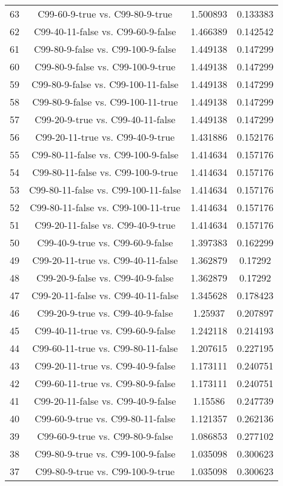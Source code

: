 \documentclass[a4paper,10pt]{article}
\begin{document}
\begin{landscape}
\begin{table}[!htp]
\begin{tabular}{cccc}
63&C99-60-9-true vs. C99-80-9-true&1.500893&0.133383\\
62&C99-40-11-false vs. C99-60-9-false&1.466389&0.142542\\
61&C99-80-9-false vs. C99-100-9-false&1.449138&0.147299\\
60&C99-80-9-false vs. C99-100-9-true&1.449138&0.147299\\
59&C99-80-9-false vs. C99-100-11-false&1.449138&0.147299\\
58&C99-80-9-false vs. C99-100-11-true&1.449138&0.147299\\
57&C99-20-9-true vs. C99-40-11-false&1.449138&0.147299\\
56&C99-20-11-true vs. C99-40-9-true&1.431886&0.152176\\
55&C99-80-11-false vs. C99-100-9-false&1.414634&0.157176\\
54&C99-80-11-false vs. C99-100-9-true&1.414634&0.157176\\
53&C99-80-11-false vs. C99-100-11-false&1.414634&0.157176\\
52&C99-80-11-false vs. C99-100-11-true&1.414634&0.157176\\
51&C99-20-11-false vs. C99-40-9-true&1.414634&0.157176\\
50&C99-40-9-true vs. C99-60-9-false&1.397383&0.162299\\
49&C99-20-11-true vs. C99-40-11-false&1.362879&0.17292\\
48&C99-20-9-false vs. C99-40-9-false&1.362879&0.17292\\
47&C99-20-11-false vs. C99-40-11-false&1.345628&0.178423\\
46&C99-20-9-true vs. C99-40-9-false&1.25937&0.207897\\
45&C99-40-11-true vs. C99-60-9-false&1.242118&0.214193\\
44&C99-60-11-true vs. C99-80-11-false&1.207615&0.227195\\
43&C99-20-11-true vs. C99-40-9-false&1.173111&0.240751\\
42&C99-60-11-true vs. C99-80-9-false&1.173111&0.240751\\
41&C99-20-11-false vs. C99-40-9-false&1.15586&0.247739\\
40&C99-60-9-true vs. C99-80-11-false&1.121357&0.262136\\
39&C99-60-9-true vs. C99-80-9-false&1.086853&0.277102\\
38&C99-80-9-true vs. C99-100-9-false&1.035098&0.300623\\
37&C99-80-9-true vs. C99-100-9-true&1.035098&0.300623\\

\end{tabular}
\end{table}
\end{landscape}
\end{document}
